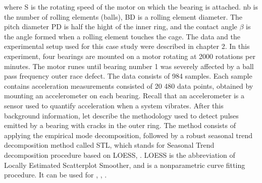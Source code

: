 \documentclass[../Main/thesis.tex]{subfiles}
\begin{document}
where S is the rotating speed of the motor on which the bearing is attached. nb is the number of rolling elements (balls), BD is a rolling element diameter. The pitch diameter PD is half the hight of the inner ring, and the contact angle $\beta$ is the angle formed when a rolling element touches the cage. The data and the experimental setup used for this case study were described in chapter 2. In this experiment, four bearings are mounted on a motor rotating at 2000 rotations per minutes. The motor runes until bearing number 1 was severely affected by a ball pass frequency outer race defect. The data consists of 984 samples. Each sample contains  acceleration measurements consisted of 20 480 data points, obtained by mounting an accelerometer on each bearing. Recall that an accelerometer is a sensor used to quantify acceleration when a system vibrates. After this background information, let describe the methodology used to detect pulses emitted by a bearing with cracks in the outer ring.
\justify
The method consists of applying the empirical mode decomposition, followed by a robust seasonal trend decomposition method called STL, which stands for Seasonal Trend decomposition procedure based on LOESS,  \cite{Cleveland-et-al-1990}. LOESS is the abbreviation of Locally Estimated Scatterplot Smoother, and is a nonparametric curve fitting procedure. It can be used for , \cite{Cleveland-1979}, \cite{Cleveland-et-al-1988}.
\justify
\end{document}
